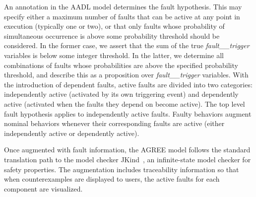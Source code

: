 An annotation in the AADL model determines the fault hypothesis.  This may specify either a maximum number of faults that can be active at any point in execution (typically one or two), or that only faults whose probability of simultaneous occurrence is above some probability threshold should be considered. In the former case, we assert that the sum of the true {\em fault\_\_trigger} variables is below some integer threshold.  In the latter, we determine all combinations of faults whose probabilities are above the specified probability threshold, and describe this as a proposition over {\em fault\_\_trigger} variables.
%
With the introduction of dependent faults, active faults are divided into two categories: independently active (activated by its own triggering event) and dependently active (activated when the faults they depend on become active). The top level fault hypothesis applies to independently active faults. Faulty behaviors augment nominal behaviors whenever their corresponding faults are active (either independently active or dependently active).

Once augmented with fault information, the AGREE model follows the standard translation path to the model checker JKind~\cite{2017arXiv171201222G}, an infinite-state model checker for safety properties.  The augmentation includes traceability information so that when counterexamples are displayed to users, the active faults for each component are visualized.

